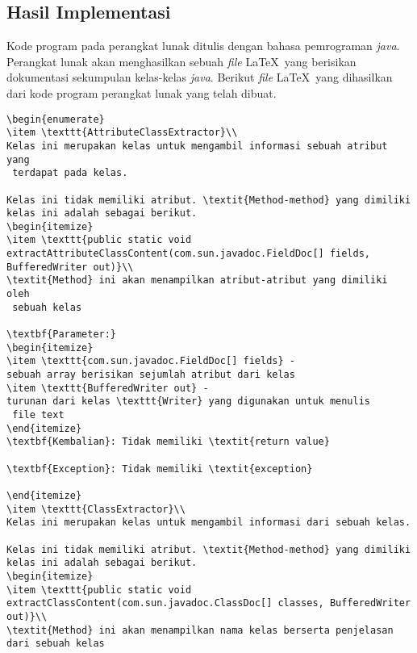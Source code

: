 \subsection{Hasil Implementasi}
\label{sec:hasil implementasi}
Kode program pada perangkat lunak ditulis dengan bahasa pemrograman {\it java}. Perangkat lunak akan menghasilkan sebuah {\it file} \LaTeX\ yang berisikan dokumentasi sekumpulan kelas-kelas {\it java}. Berikut {\it file} \LaTeX\ yang dihasilkan dari kode program perangkat lunak yang telah dibuat.
\begin{lstlisting}[caption=Hasil Implementasi]
\begin{enumerate}
\item \texttt{AttributeClassExtractor}\\ 
Kelas ini merupakan kelas untuk mengambil informasi sebuah atribut yang
 terdapat pada kelas.

Kelas ini tidak memiliki atribut. \textit{Method-method} yang dimiliki kelas ini adalah sebagai berikut.
\begin{itemize}
\item \texttt{public static void extractAttributeClassContent(com.sun.javadoc.FieldDoc[] fields, BufferedWriter out)}\\ 
\textit{Method} ini akan menampilkan atribut-atribut yang dimiliki oleh
 sebuah kelas

\textbf{Parameter:}
\begin{itemize}
\item \texttt{com.sun.javadoc.FieldDoc[] fields} - 
sebuah array berisikan sejumlah atribut dari kelas
\item \texttt{BufferedWriter out} - 
turunan dari kelas \texttt{Writer} yang digunakan untuk menulis
 file text
\end{itemize}
\textbf{Kembalian}: Tidak memiliki \textit{return value}

\textbf{Exception}: Tidak memiliki \textit{exception}

\end{itemize}
\item \texttt{ClassExtractor}\\ 
Kelas ini merupakan kelas untuk mengambil informasi dari sebuah kelas.

Kelas ini tidak memiliki atribut. \textit{Method-method} yang dimiliki kelas ini adalah sebagai berikut.
\begin{itemize}
\item \texttt{public static void extractClassContent(com.sun.javadoc.ClassDoc[] classes, BufferedWriter out)}\\ 
\textit{Method} ini akan menampilkan nama kelas berserta penjelasan dari sebuah kelas


\end{lstlisting}
